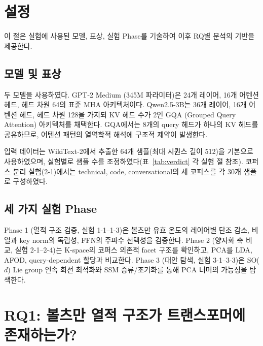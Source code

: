 \documentclass[11pt,a4paper]{article}
\begin{document}
\newpage

\section{설정}

이 절은 실험에 사용된 모델, 표상, 실험 Phase를 기술하여 이후 RQ별 분석의 기반을 제공한다.

\subsection{모델 및 표상}

두 모델을 사용하였다. GPT-2 Medium (345M 파라미터)은 24개 레이어, 16개 어텐션 헤드, 헤드 차원 64의 표준 MHA 아키텍처이다. Qwen2.5-3B는 36개 레이어, 16개 어텐션 헤드, 헤드 차원 128을 가지되 KV 헤드 수가 2인 GQA (Grouped Query Attention) 아키텍처를 채택한다. GQA에서는 8개의 query 헤드가 하나의 KV 헤드를 공유하므로, 어텐션 패턴의 열역학적 해석에 구조적 제약이 발생한다.

입력 데이터는 WikiText-2에서 추출한 64개 샘플(최대 시퀀스 길이 512)을 기본으로 사용하였으며, 실험별로 샘플 수를 조정하였다(표~\ref{tab:verdict} 각 실험 절 참조). 코퍼스 분리 실험(2-1)에서는 technical, code, conversational의 세 코퍼스를 각 30개 샘플로 구성하였다.

\subsection{세 가지 실험 Phase}

Phase 1 (열적 구조 검증, 실험 1-1--1-3)은 볼츠만 유효 온도의 레이어별 단조 감소, 비열과 key norm의 독립성, FFN의 주파수 선택성을 검증한다. Phase 2 (양자화 축 비교, 실험 2-1--2-4)는 K-space의 코퍼스 의존적 facet 구조를 확인하고, PCA를 LDA, AFOD, query-dependent 할당과 비교한다. Phase 3 (대안 탐색, 실험 3-1--3-3)은 SO($d$) Lie group 연속 회전 최적화와 SSM 증류/초기화를 통해 PCA 너머의 가능성을 탐색한다.

\newpage

\section{RQ1: 볼츠만 열적 구조가 트랜스포머에 존재하는가?}
\end{document}
